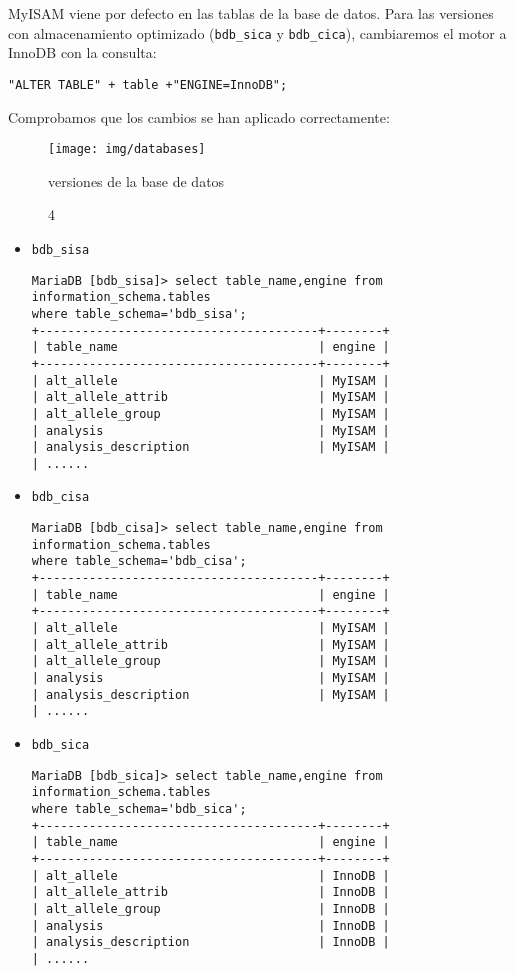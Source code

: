 \documentclass[12pt,a4paper]{article}
\begin{document}
MyISAM viene por defecto en las tablas de la base de datos. Para las versiones con almacenamiento optimizado (\verb|bdb_sica| y \verb|bdb_cica|), cambiaremos el motor a InnoDB con la consulta:

\verb|"ALTER TABLE" + table +"ENGINE=InnoDB";|



Comprobamos que los cambios se han aplicado correctamente:

\begin{figure}[!h]
\centering
\texttt{[image: img/databases]}
\caption 4 versiones de la base de datos \cite{cDB15}
\label{fig3}
\end{figure}

\begin{itemize}
	\item \verb|bdb_sisa|
	\begin{verbatim}
MariaDB [bdb_sisa]> select table_name,engine from information_schema.tables 
where table_schema='bdb_sisa';
+---------------------------------------+--------+
| table_name                            | engine |
+---------------------------------------+--------+
| alt_allele                            | MyISAM |
| alt_allele_attrib                     | MyISAM |
| alt_allele_group                      | MyISAM |
| analysis                              | MyISAM |
| analysis_description                  | MyISAM |
| ......
	\end{verbatim}
	
	\item \verb|bdb_cisa|
	\begin{verbatim}
MariaDB [bdb_cisa]> select table_name,engine from information_schema.tables 
where table_schema='bdb_cisa';
+---------------------------------------+--------+
| table_name                            | engine |
+---------------------------------------+--------+
| alt_allele                            | MyISAM |
| alt_allele_attrib                     | MyISAM |
| alt_allele_group                      | MyISAM |
| analysis                              | MyISAM |
| analysis_description                  | MyISAM |
| ......
	\end{verbatim}
	
	\item \verb|bdb_sica|
	\begin{verbatim}
MariaDB [bdb_sica]> select table_name,engine from information_schema.tables 
where table_schema='bdb_sica';
+---------------------------------------+--------+
| table_name                            | engine |
+---------------------------------------+--------+
| alt_allele                            | InnoDB |
| alt_allele_attrib                     | InnoDB |
| alt_allele_group                      | InnoDB |
| analysis                              | InnoDB |
| analysis_description                  | InnoDB |
| ......
\end{verbatim}
	

\end{itemize}
\end{document}
